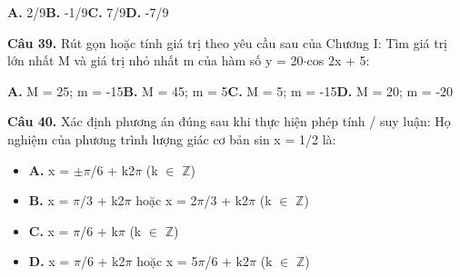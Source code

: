 \documentclass[11pt,a4paper]{article}
\begin{document}
\hspace*{1.5em}\textbf{A.} 2/9\quad\quad \textbf{B.} -1/9\quad\quad \textbf{C.} 7/9\quad\quad \textbf{D.} -7/9\par\vspace{2pt}
\textbf{\color{primary} Câu 39.} Rút gọn hoặc tính giá trị theo yêu cầu sau của Chương I: Tìm giá trị lớn nhất M và giá trị nhỏ nhất m của hàm số y = 20$\cdot$cos 2x + 5:\par
\hspace*{1.5em}\textbf{A.} M = 25; m = -15\quad\quad \textbf{B.} M = 45; m = 5\quad\quad \textbf{C.} M = 5; m = -15\quad\quad \textbf{D.} M = 20; m = -20\par\vspace{2pt}
\textbf{\color{primary} Câu 40.} Xác định phương án đúng sau khi thực hiện phép tính / suy luận: Họ nghiệm của phương trình lượng giác cơ bản sin x = 1/2 là:\par
\begin{itemize}\setlength{\itemsep}{1pt}\setlength{\parskip}{0pt}
  \item[] \textbf{A.} x = $\pm$$\pi$/6 + k2$\pi$ (k $\in$ $\mathbb{Z}$)
  \item[] \textbf{B.} x = $\pi$/3 + k2$\pi$ hoặc x = 2$\pi$/3 + k2$\pi$ (k $\in$ $\mathbb{Z}$)
  \item[] \textbf{C.} x = $\pi$/6 + k$\pi$ (k $\in$ $\mathbb{Z}$)
  \item[] \textbf{D.} x = $\pi$/6 + k2$\pi$ hoặc x = 5$\pi$/6 + k2$\pi$ (k $\in$ $\mathbb{Z}$)
\end{itemize}\vspace{2pt}
\end{document}
